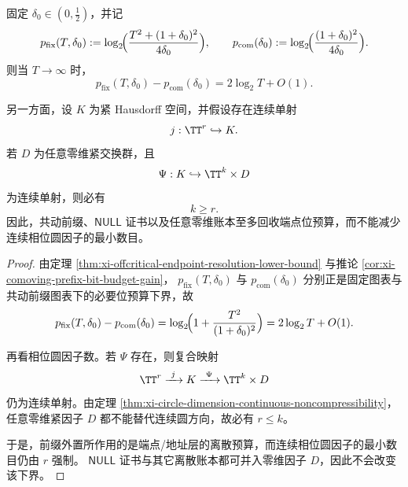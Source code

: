 \begin{theorem}[地址前缀与相位圆因子的正交资源律]\label{thm:xi-prefix-phase-circle-orthogonal-resource-law}
固定 \(\delta_0\in(0,\tfrac12)\)，并记
\[
p_{\mathrm{fix}}(T,\delta_0):=
\log_2\!\Bigl(\frac{T^2+(1+\delta_0)^2}{4\delta_0}\Bigr),
\qquad
p_{\mathrm{com}}(\delta_0):=
\log_2\!\Bigl(\frac{(1+\delta_0)^2}{4\delta_0}\Bigr).
\]
则当 \(T\to\infty\) 时，
\[
p_{\mathrm{fix}}(T,\delta_0)-p_{\mathrm{com}}(\delta_0)=2\log_2T+O(1).
\]

另一方面，设 \(K\) 为紧 Hausdorff 空间，并假设存在连续单射
\[
j:\TT^r\hookrightarrow K.
\]
若 \(D\) 为任意零维紧交换群，且
\[
\Psi:K\hookrightarrow \TT^k\times D
\]
为连续单射，则必有
\[
k\ge r.
\]
因此，共动前缀、\(\mathsf{NULL}\) 证书以及任意零维账本至多回收端点位预算，而不能减少连续相位圆因子的最小数目。
\end{theorem}
\begin{proof}
由定理 \ref{thm:xi-offcritical-endpoint-resolution-lower-bound} 与推论 \ref{cor:xi-comoving-prefix-bit-budget-gain}，
\(
p_{\mathrm{fix}}(T,\delta_0)
\)
与
\(
p_{\mathrm{com}}(\delta_0)
\)
分别正是固定图表与共动前缀图表下的必要位预算下界，故
\[
p_{\mathrm{fix}}(T,\delta_0)-p_{\mathrm{com}}(\delta_0)
=
\log_2\!\Bigl(1+\frac{T^2}{(1+\delta_0)^2}\Bigr)
=
2\log_2 T+O(1).
\]

再看相位圆因子数。若 \(\Psi\) 存在，则复合映射
\[
\TT^r\xrightarrow{\ j\ } K \xrightarrow{\ \Psi\ } \TT^k\times D
\]
仍为连续单射。由定理 \ref{thm:xi-circle-dimension-continuous-noncompressibility}，
任意零维紧因子 \(D\) 都不能替代连续圆方向，故必有 \(r\le k\)。

于是，前缀外置所作用的是端点/地址层的离散预算，而连续相位圆因子的最小数目仍由 \(r\) 强制。
\(\mathsf{NULL}\) 证书与其它离散账本都可并入零维因子 \(D\)，因此不会改变该下界。
\end{proof}

\endinput
